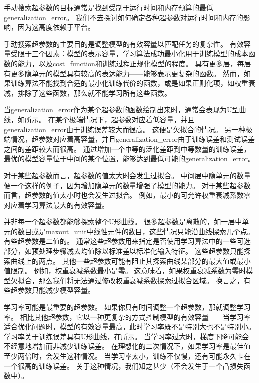 手动搜索超参数的目标通常是找到受制于运行时间和内存预算的最低\gls{generalization_error}。
我们不去探讨如何确定各种超参数对运行时间和内存的影响，因为这高度依赖于平台。

手动搜索超参数的主要目的是调整模型的有效容量以匹配任务的复杂性。
有效容量受限于三个因素：模型的表示容量，学习算法成功最小化用于训练模型的成本函数的能力，以及\gls{cost_function}和训练过程正规化模型的程度。
具有更多层，每层有更多隐单元的模型具有较高的表达能力——能够表示更复杂的函数。
然而，如果训练算法不能找到合适的最小化训练代价的函数，或是如果正则化项，如权重衰减，排除了这些函数，那么就不能学习所有这些函数。

当\gls{generalization_error}作为某个超参数的函数绘制出来时，通常会表现为U型曲线，如所示。
在某个极端情况下，超参数对应着低容量，并且\gls{generalization_error}由于训练误差较大而很高。
这便是欠拟合的情况。
另一种极端情况，超参数对应着高容量，并且\gls{generalization_error}由于训练误差和测试误差之间的差距较大而很高。
通过增加一个中等的泛化差距到中等数量的训练误差，最优的模型容量位于中间的某个位置，能够达到最低可能的\gls{generalization_error}。


对于某些超参数而言，超参数的值太大时会发生过拟合。
中间层中隐单元的数量便一个这样的例子，因为增加隐单元的数量增强了模型的能力。
对于某些超参数而言，超参数的值太小时也会发生过拟合。
例如，最小的可允许权重衰减系数零对应着学习算法最大的有效容量。

并非每一个超参数都能够探索整个U形曲线。
很多超参数是离散的，如一层中单元的数目或是\gls{maxout_unit}中线性元件的数目，这些情况只能沿曲线探索几个点。
有些超参数是二值的。
通常这些超参数用来指定是否使用学习算法中的一些可选部分，如预处理步骤减去均值除以标准差以标准化输入特征。
这些超参数只能探索曲线上的两点。
其他一些超参数可能有阻止其探索曲线某部分的最大值或最小值限制。
例如，权重衰减系数最小是零。
这意味着，如果权重衰减系数为零时模型欠拟合，那么我们将无法通过修改权重衰减系数探索过拟合区域。
换言之，有些超参数只能减少模型容量。

学习率可能是最重要的超参数。
如果你只有时间调整一个超参数，那就调整学习率。
相比其他超参数，它以一种更复杂的方式控制模型的有效容量——当学习率适合优化问题时，模型的有效容量最高，此时学习率既不是特别大也不是特别小。
学习率关于训练误差具有U形曲线，在所示。
当学习率过大时，梯度下降可能会不经意地增加而非减少训练误差。
在理想化的二次情况下，如果学习率是最佳值至少两倍时，会发生这种情况\citep{LeCun+98backprop-small}。
当学习率太小，训练不仅慢，还有可能永久卡在一个很高的训练误差。
关于这种情况，我们知之甚少（不会发生于一个凸损失函数中）。

